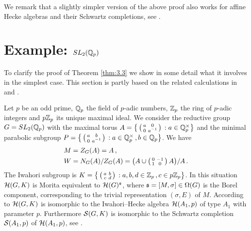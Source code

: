 We remark that a slightly simpler version of the above proof also works for 
affine Hecke algebras and their Schwartz completions, see \cite{Sol2}. 
\vspace{4mm}




\section{Example: $SL_2 (\mathbb Q_p )$}
\label{sec:3.2}

To clarify the proof of Theorem \ref{thm:3.3} we show in some detail what it
involves in the simplest case. This section is partly based on the related 
calculations in \cite{BHP1} and \cite[Section 6.1]{Sol3}.

Let $p$ be an odd prime, $\mathbb Q_p$ the field of
$p$-adic numbers, $\mathbb Z_p$ the ring of $p$-adic integers and $p \mathbb Z_p$
its unique maximal ideal. We consider the reductive group
$G = SL_2 (\mathbb Q_p )$ with the maximal torus
$A = \big\{ \left(\begin{smallmatrix} a & 0 \\ 0 & a^{-1} \end{smallmatrix}\right) \,: a \in \mathbb Q^\times_p \big\}$
and the minimal parabolic subgroup
$P = \big\{ \left(\begin{smallmatrix} a & b \\ 0 & a^{-1} \end{smallmatrix}\right) \,: a \in \mathbb Q^\times_p\,, b \in \mathbb Q_p \big\} $.
We have 
\begin{align*}
& M = Z_G (A)  = A \,, \\
& W = N_G (A) / Z_G (A) = \big( A \cup \left(\begin{smallmatrix} 0 & -1 \\ 1 & 0 \end{smallmatrix}\right) A \big) / A \,.
\end{align*}
The Iwahori subgroup is
$K = \big\{ \left(\begin{smallmatrix} a & b \\ c & d \end{smallmatrix}\right) \,: a,b,d \in \mathbb Z_p \,, c \in p \mathbb Z_p \big\} $.
In this situation $\mathcal H (G,K)$ is Morita equivalent to $\mathcal H (G )^{\mathfrak s}$,
where $\mathfrak s = [M,\sigma ] \in \Omega (G)$ is the Borel component, 
corresponding to the trivial representation $(\sigma ,E)$ of $M$. According to
\cite{IwMa} $\mathcal H (G,K)$ is isomorphic to the Iwahori--Hecke algebra 
$\mathcal H (A_1 ,p)$ of type $A_1$ with parameter $p$. Furthermore $\mathcal S (G,K)$
is isomorphic to the Schwartz completion $\mathcal S (A_1 ,p)$ of $\mathcal H (A_1 ,p)$,
see \cite{DeOp1}.

